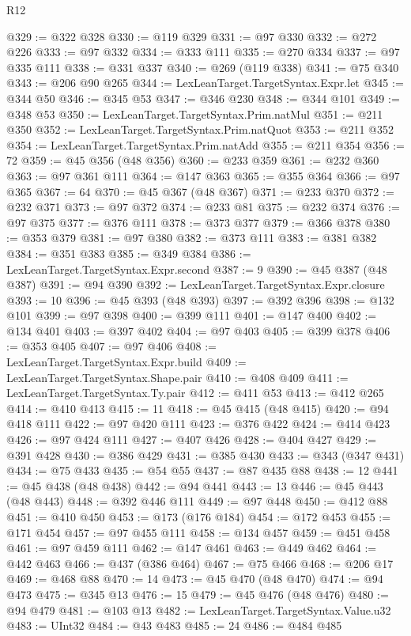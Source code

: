 \begin{lexlean}{R12}
\begin{coremodule}
{{{{{{{{{{{{{{{{{{{{{{{{{{{{{{{{{{{{{{{{{{{{{{{{{{{{{{{{{{{{{{{{{{{{{{{{{{{{{{{{{{@329 := @322 @328
@330 := @119 @329
@331 := @97 @330
@332 := @272 @226
@333 := @97 @332
@334 := @333 @111
@335 := @270 @334
@337 := @97 @335 @111
@338 := @331 @337
@340 := @269 (@119 @338)
@341 := @75 @340
@343 := @206 @90 @265
@344 := LexLeanTarget.TargetSyntax.Expr.let
@345 := @344 @50
@346 := @345 @53
@347 := @346 @230
@348 := @344 @101
@349 := @348 @53
@350 := LexLeanTarget.TargetSyntax.Prim.natMul
@351 := @211 @350
@352 := LexLeanTarget.TargetSyntax.Prim.natQuot
@353 := @211 @352
@354 := LexLeanTarget.TargetSyntax.Prim.natAdd
@355 := @211 @354
@356 := 72
@359 := @45 @356 (@48 @356)
@360 := @233 @359
@361 := @232 @360
@363 := @97 @361 @111
@364 := @147 @363
@365 := @355 @364
@366 := @97 @365
@367 := 64
@370 := @45 @367 (@48 @367)
@371 := @233 @370
@372 := @232 @371
@373 := @97 @372
@374 := @233 @81
@375 := @232 @374
@376 := @97 @375
@377 := @376 @111
@378 := @373 @377
@379 := @366 @378
@380 := @353 @379
@381 := @97 @380
@382 := @373 @111
@383 := @381 @382
@384 := @351 @383
@385 := @349 @384
@386 := LexLeanTarget.TargetSyntax.Expr.second
@387 := 9
@390 := @45 @387 (@48 @387)
@391 := @94 @390
@392 := LexLeanTarget.TargetSyntax.Expr.closure
@393 := 10
@396 := @45 @393 (@48 @393)
@397 := @392 @396
@398 := @132 @101
@399 := @97 @398
@400 := @399 @111
@401 := @147 @400
@402 := @134 @401
@403 := @397 @402
@404 := @97 @403
@405 := @399 @378
@406 := @353 @405
@407 := @97 @406
@408 := LexLeanTarget.TargetSyntax.Expr.build
@409 := LexLeanTarget.TargetSyntax.Shape.pair
@410 := @408 @409
@411 := LexLeanTarget.TargetSyntax.Ty.pair
@412 := @411 @53
@413 := @412 @265
@414 := @410 @413
@415 := 11
@418 := @45 @415 (@48 @415)
@420 := @94 @418 @111
@422 := @97 @420 @111
@423 := @376 @422
@424 := @414 @423
@426 := @97 @424 @111
@427 := @407 @426
@428 := @404 @427
@429 := @391 @428
@430 := @386 @429
@431 := @385 @430
@433 := @343 (@347 @431)
@434 := @75 @433
@435 := @54 @55
@437 := @87 @435 @88
@438 := 12
@441 := @45 @438 (@48 @438)
@442 := @94 @441
@443 := 13
@446 := @45 @443 (@48 @443)
@448 := @392 @446 @111
@449 := @97 @448
@450 := @412 @88
@451 := @410 @450
@453 := @173 (@176 @184)
@454 := @172 @453
@455 := @171 @454
@457 := @97 @455 @111
@458 := @134 @457
@459 := @451 @458
@461 := @97 @459 @111
@462 := @147 @461
@463 := @449 @462
@464 := @442 @463
@466 := @437 (@386 @464)
@467 := @75 @466
@468 := @206 @17
@469 := @468 @88
@470 := 14
@473 := @45 @470 (@48 @470)
@474 := @94 @473
@475 := @345 @13
@476 := 15
@479 := @45 @476 (@48 @476)
@480 := @94 @479
@481 := @103 @13
@482 := LexLeanTarget.TargetSyntax.Value.u32
@483 := UInt32
@484 := @43 @483
@485 := 24
@486 := @484 @485
}}}}}}}}}}}}}}}}}}}}}}}}}}}}}}}}}}}}}}}}}}}}}}}}}}}}}}}}}}}}}}}}}}}}}}}}}}}}}}}}}}
\end{coremodule}
\end{lexlean}
